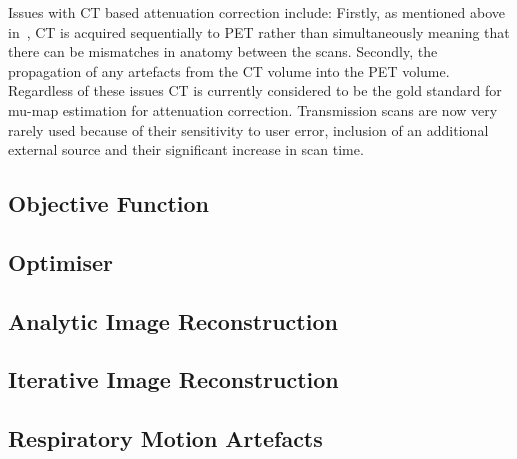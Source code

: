                 Issues with \gls{CT} based attenuation correction include: Firstly, as mentioned above in~, \gls{CT} is acquired sequentially to \gls{PET} rather than simultaneously meaning that there can be mismatches in anatomy between the scans. Secondly, the propagation of any artefacts from the \gls{CT} volume into the \gls{PET} volume. Regardless of these issues \gls{CT} is currently considered to be the gold standard for \gls{mu-map} estimation for attenuation correction. Transmission scans are now very rarely used because of their sensitivity to user error, inclusion of an additional external source and their significant increase in scan time.
    
        
        
        \subsection{Objective Function} \label{sec:objective_function}
            
            
        \subsection{Optimiser} \label{sec:optimiser}
            
            
        
        
        \subsection{Analytic Image Reconstruction} \label{sec:analytic_image_reconstruction}
            
            
        \subsection{Iterative Image Reconstruction} \label{sec:iterative_image_reconstruction}
                
                
        
        
        \subsection{Respiratory Motion Artefacts} \label{sec:respiratory_motion_artefacts}
            
